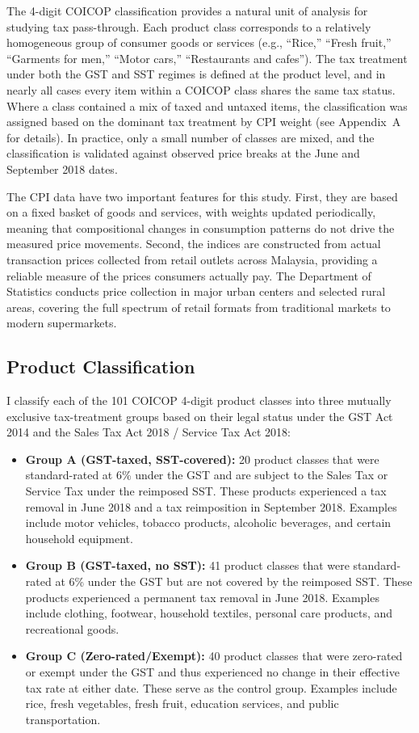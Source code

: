 \documentclass[12pt]{article}
\begin{document}
The 4-digit COICOP classification provides a natural unit of analysis for studying tax pass-through. Each product class corresponds to a relatively homogeneous group of consumer goods or services (e.g., ``Rice,'' ``Fresh fruit,'' ``Garments for men,'' ``Motor cars,'' ``Restaurants and cafes''). The tax treatment under both the GST and SST regimes is defined at the product level, and in nearly all cases every item within a COICOP class shares the same tax status. Where a class contained a mix of taxed and untaxed items, the classification was assigned based on the dominant tax treatment by CPI weight (see Appendix~A for details). In practice, only a small number of classes are mixed, and the classification is validated against observed price breaks at the June and September 2018 dates.

The CPI data have two important features for this study. First, they are based on a fixed basket of goods and services, with weights updated periodically, meaning that compositional changes in consumption patterns do not drive the measured price movements. Second, the indices are constructed from actual transaction prices collected from retail outlets across Malaysia, providing a reliable measure of the prices consumers actually pay. The Department of Statistics conducts price collection in major urban centers and selected rural areas, covering the full spectrum of retail formats from traditional markets to modern supermarkets.

\subsection{Product Classification}

I classify each of the 101 COICOP 4-digit product classes into three mutually exclusive tax-treatment groups based on their legal status under the GST Act 2014 and the Sales Tax Act 2018 / Service Tax Act 2018:

\begin{itemize}
\item \textbf{Group A (GST-taxed, SST-covered):} 20 product classes that were standard-rated at 6\% under the GST and are subject to the Sales Tax or Service Tax under the reimposed SST. These products experienced a tax removal in June 2018 and a tax reimposition in September 2018. Examples include motor vehicles, tobacco products, alcoholic beverages, and certain household equipment.

\item \textbf{Group B (GST-taxed, no SST):} 41 product classes that were standard-rated at 6\% under the GST but are not covered by the reimposed SST. These products experienced a permanent tax removal in June 2018. Examples include clothing, footwear, household textiles, personal care products, and recreational goods.

\item \textbf{Group C (Zero-rated/Exempt):} 40 product classes that were zero-rated or exempt under the GST and thus experienced no change in their effective tax rate at either date. These serve as the control group. Examples include rice, fresh vegetables, fresh fruit, education services, and public transportation.
\end{itemize}
\end{document}

